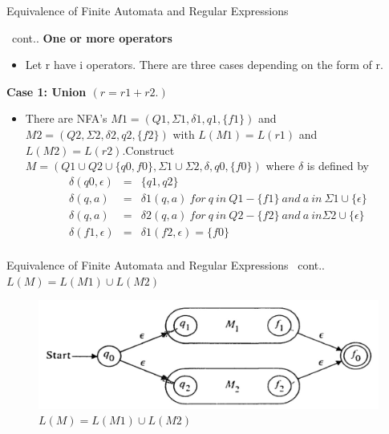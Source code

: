 \documentclass{beamer}
\begin{document}
\begin{frame}{Equivalence of Finite Automata and Regular Expressions}

	\proofname \ cont.. 
	\textbf{One or more operators}
	\begin{itemize}
		\item Let r have i operators. There are three cases depending on the form of r.
	\end{itemize}
\textbf{Case 1: Union $(r = r1 + r2.)$}

\begin{itemize}
	\item There are NFA’s $M1 = (Q1, \Sigma1, \delta1, q1, \{f1\})$ and $M2=(Q2, \Sigma2, \delta2, q2, \{f2\})$ with $L(M1) = L(r1)$ and $L(M2) = L(r2)$.Construct $M = (Q1 \cup Q2 \cup \{q0, f0\}, \Sigma1 \cup \Sigma2, \delta, q0, \{f0\})$ where $\delta$ is defined by
	\begin{eqnarray*}
		\delta (q0, \epsilon) &=& \{q1,q2\}\\
		 \delta (q, a) &=& \delta1(q ,a)\  for\  q \ in\  Q1-\{f1\}\  and\  a \ in\  \Sigma1 \cup \{ \epsilon \}\\
		\delta (q, a) &=& \delta2(q ,a)\  for \ q\  in\  Q2-\{f2\} \ and\  a\  in \Sigma2 \cup \{ \epsilon \}\\
		 \delta (f1, \epsilon) &=& \delta1(f2, \epsilon) = \{ f0 \}\\
	\end{eqnarray*}
\end{itemize}
\end{frame}
\begin{frame}{Equivalence of Finite Automata and Regular Expressions}
	\proofname \ cont..\\ 
	$L(M) = L(M1) \cup L(M2)$
		\begin{figure}
		\includegraphics[scale=.3]{img2/m3}
		\caption{	$L(M) = L(M1) \cup L(M2)$}
	\end{figure}
\end{frame}
\end{document}
